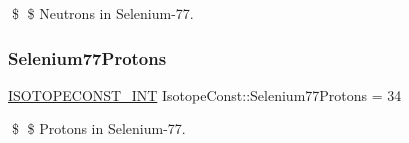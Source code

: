\$ \$ Neutrons in Selenium-\/77. \mbox{\label{group___isotope_const-_selenium-_se77_gabfe2b0dfb2ccd274d9dd25f44ae7a127}} 
\subsubsection{\texorpdfstring{Selenium77\+Protons}{Selenium77Protons}}
{\footnotesize\ttfamily \mbox{\hyperlink{group___isotope_const-_macros_ga5f18360b3e99483a35c32d789e62621c}{I\+S\+O\+T\+O\+P\+E\+C\+O\+N\+S\+T\+\_\+\+I\+NT}} Isotope\+Const\+::\+Selenium77\+Protons = 34}

\$ \$ Protons in Selenium-\/77. 